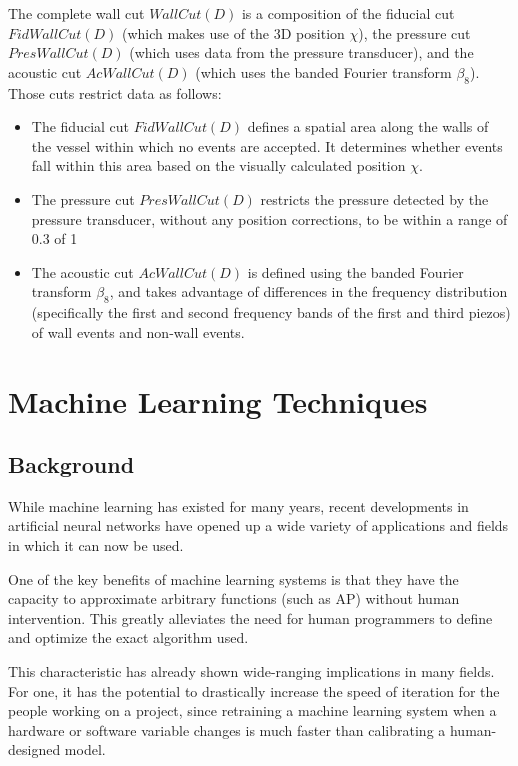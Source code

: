 \documentclass[10pt]{article}
\begin{document}
The complete wall cut $WallCut(D)$ is a composition of the fiducial cut $FidWallCut(D)$ (which makes use of the 3D position $\chi$), the pressure cut $PresWallCut(D)$ (which uses data from the pressure transducer), and the acoustic cut $AcWallCut(D)$ (which uses the banded Fourier transform $\beta _{8}$). Those cuts restrict data as follows:

\begin{itemize}
    \item The fiducial cut $FidWallCut(D)$ defines a spatial area along the walls of the vessel within which no events are accepted. It determines whether events fall within this area based on the visually calculated position $\chi$.
    \item The pressure cut $PresWallCut(D)$ restricts the pressure detected by the pressure transducer, without any position corrections, to be within a range of 0.3 of 1
    \item The acoustic cut $AcWallCut(D)$ is defined using the banded Fourier transform $\beta_{8}$, and takes advantage of differences in the frequency distribution (specifically the first and second frequency bands of the first and third piezos) of wall events and non-wall events.
\end{itemize}

\section{Machine Learning Techniques}

\subsection{Background}

While machine learning has existed for many years, recent developments in artificial neural networks have opened up a wide variety of applications and fields in which it can now be used.

One of the key benefits of machine learning systems is that they have the capacity to approximate arbitrary functions (such as AP) without human intervention. This greatly alleviates the need for human programmers to define and optimize the exact algorithm used.

This characteristic has already shown wide-ranging implications in many fields. For one, it has the potential to drastically increase the speed of iteration for the people working on a project, since retraining a machine learning system when a hardware or software variable changes is much faster than calibrating a human-designed model.
\end{document}

